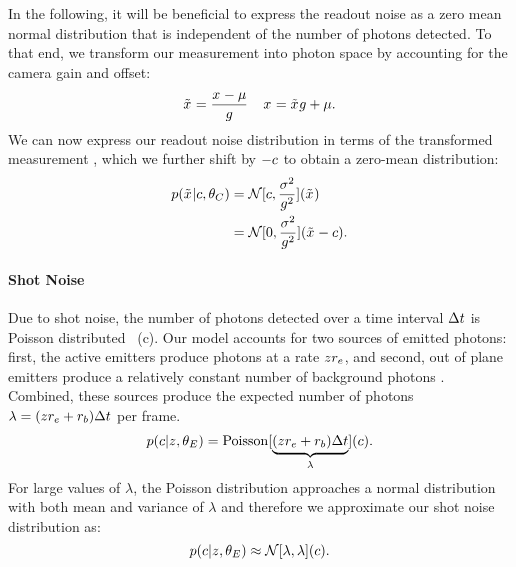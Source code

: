   In the following, it will be beneficial to express the readout noise as a
  zero mean normal distribution that is independent of the number of photons
  detected. To that end, we transform our measurement \x{} into photon space
  by accounting for the camera gain and offset:
  \begin{equation}
    \tilde{x}_{} = \frac{x_{} - \mu}{g}
    \;\;\;\;
    x_{} = \tilde{x}_{}g + \mu
    \text{.}
  \end{equation}
  We can now express our readout noise distribution in terms of the transformed
  measurement \xp{}, which we further shift by $-c$ to obtain a
  zero-mean distribution:
  \begin{align}
    p(\tilde{x}_{}|c,\theta_C)
      &= \mathcal{N}[c, \frac{\sigma^2}{g^2}](\tilde{x}_{})  \\
      &= \mathcal{N}[0, \frac{\sigma^2}{g^2}](\tilde{x}_{} - c)
      \label{eq:method:transformed_readout_noise}
    \text{.}
  \end{align}

\paragraph{Shot Noise}

Due to shot noise, the number of photons detected over a time interval
$\Delta t$ is Poisson distributed~\cite{mehta_poisson_2016}
(c).
  Our model accounts for two sources of emitted photons: first, the \z{} active
  emitters produce photons at a rate $z_{}r_e$, and second, out of plane
  emitters produce a relatively constant number of background photons \rb.
  Combined, these sources produce the expected number of photons
  $\lambda=(z_{}r_e + r_b)\Delta t$ per frame.
  \begin{equation}
    p(c|z_{},\theta_E)
      = \operatorname{Poisson}[\underbrace{(z_{}r_e + r_b)\Delta t}_{\lambda}](c)
    \text{.}
    \label{eq:methods:p_c_given_z}
  \end{equation}
  For large values of $\lambda$, the Poisson distribution approaches a normal
  distribution with both mean and variance of $\lambda$ and therefore we
  approximate our shot noise distribution as:
  \begin{equation}
    p(c|z_{},\theta_E)
      \approx \mathcal{N}[\lambda, \lambda](c)
    \text{.}
    \label{eq:method:normal_approx_shot_noise}
  \end{equation}

